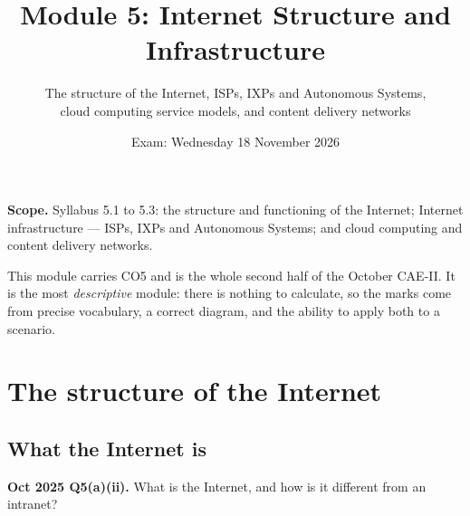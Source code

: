 \documentclass[11pt,a4paper]{article}
\title{\textbf{Module 5: Internet Structure and Infrastructure}\\}
\author{\large The structure of the Internet, ISPs, IXPs and Autonomous Systems,\\
cloud computing service models, and content delivery networks}
\date{Exam: Wednesday 18 November 2026}
\begin{document}
\maketitle

\begin{exambox}
\textbf{Scope.} Syllabus 5.1 to 5.3: the structure and functioning of the Internet; Internet infrastructure --- ISPs, IXPs and Autonomous Systems; and cloud computing and content delivery networks.

This module carries CO5 and is the whole second half of the October CAE-II. It is the most \emph{descriptive} module: there is nothing to calculate, so the marks come from precise vocabulary, a correct diagram, and the ability to apply both to a scenario.
\end{exambox}

\tableofcontents
\newpage

\section{The structure of the Internet}

\subsection{What the Internet is}

\begin{pyqbox}
\textbf{Oct 2025 Q5(a)(ii).} What is the Internet, and how is it different from an intranet?
\end{pyqbox}
\end{document}
